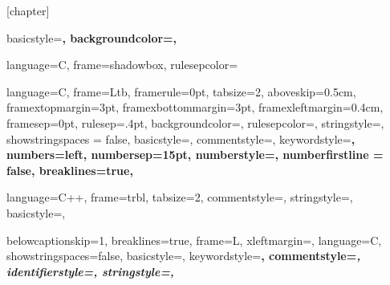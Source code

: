 \makeatletter
\newcommand*{\cleartoleftpage}{%
  \clearpage
  \if@twoside
  \ifodd\c@page
  \hbox{}\newpage
  \if@twocolumn
  \hbox{}\newpage
  \fi
  \fi
  \fi
}
\makeatother

% 
% 
\usepackage{float}
[chapter]

{
  basicstyle=\scriptsize\bf\ttfamily,
  backgroundcolor=\color{gray75},
}

{
  language=C,
  frame=shadowbox, 
  rulesepcolor=\color{blue}
}

{
  language=C,
  frame=Ltb,
  framerule=0pt,
  tabsize=2,
  aboveskip=0.5cm,
  framextopmargin=3pt,
  framexbottommargin=3pt,
  framexleftmargin=0.4cm,
  framesep=0pt,
  rulesep=.4pt,
  backgroundcolor=\color{gray97},
  rulesepcolor=\color{black},
  stringstyle=\ttfamily,
  showstringspaces = false,
  basicstyle=\footnotesize\ttfamily,
  commentstyle=\color{gray45},
  keywordstyle=\bfseries,
  numbers=left,
  numbersep=15pt,
  numberstyle=\tiny,
  numberfirstline = false,
  breaklines=true,
}	

{
  language=C++,
  frame=trbl,
  tabsize=2,
  commentstyle=\textit,
  stringstyle=\ttfamily, 
  basicstyle=\small,
}	

{
  belowcaptionskip=1\baselineskip,
  breaklines=true,
  frame=L,
  xleftmargin=\parindent,
  language=C,
  showstringspaces=false,
  basicstyle=\footnotesize\ttfamily,
  keywordstyle=\bfseries\color{green!40!black},
  commentstyle=\itshape\color{purple!40!black},
  identifierstyle=\color{blue},
  stringstyle=\color{orange},
}




